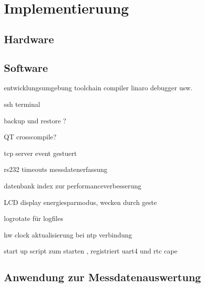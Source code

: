\chapter{Implementieruung}
\label{chapter_Implementierung}

\section{Hardware}

\section{Software}

entwicklungsumgebung toolchain compiler linaro debugger usw. 

ssh terminal

backup und restore ?

QT crosscompile?

tcp server event gestuert

rs232 timeouts messdatenerfassung

datenbank index zur performanceverbesserung

LCD display energiesparmodus, wecken durch geste

logrotate für logfiles

hw clock aktualisierung bei ntp verbindung

start up script zum starten , registriert uart4 und rtc cape
\section{Anwendung zur Messdatenauswertung}